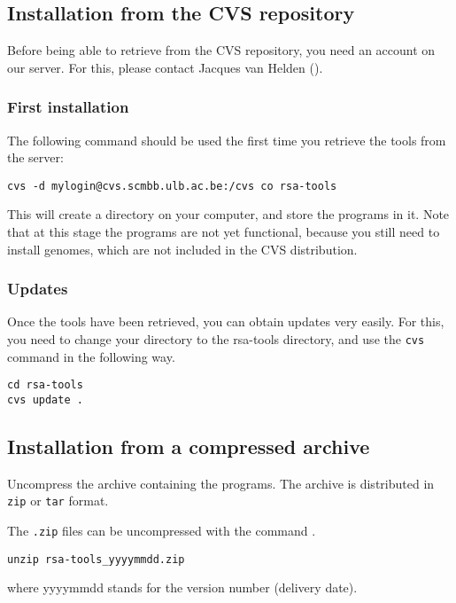 \documentclass{article}
\begin{document}
\subsection{Installation from the CVS repository}


Before being able to retrieve \RSAT from the CVS repository, you need
an account on our server. For this, please contact Jacques van Helden
().

\subsubsection{First installation}

The following command should be used the first time you retrieve the
tools from the server:
\begin{verbatim}
cvs -d mylogin@cvs.scmbb.ulb.ac.be:/cvs co rsa-tools
\end{verbatim}

This will create a directory  on your computer, and
store the programs in it. Note that at this stage the programs are not
yet functional, because you still need to install genomes, which are
not included in the CVS distribution.

\subsubsection{Updates}

Once the tools have been retrieved, you can obtain updates very
easily. For this, you need to change your directory to the rsa-tools
directory, and use the \texttt{cvs} command in the following way.

\begin{verbatim}
cd rsa-tools
cvs update .
\end{verbatim}


\subsection{Installation from a compressed archive}

Uncompress the archive containing the programs. The archive is
distributed in \texttt{zip} or \texttt{tar} format.

The \texttt{.zip} files can be uncompressed with the command
.

\begin{verbatim}
unzip rsa-tools_yyyymmdd.zip
\end{verbatim}
where yyyymmdd stands for the version number (delivery date).
\end{document}
